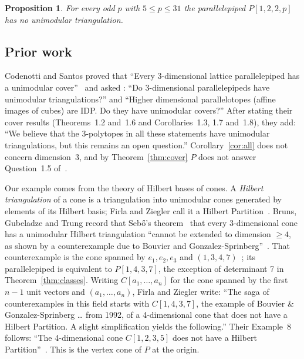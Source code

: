 \documentclass[11pt]{article}
\newtheorem{proposition}[theorem]{Proposition}
\theoremstyle{definition}
\begin{document}
\begin{proposition}\label{prop:family}
For every odd $p$ with $5\le p\le 31$ the parallelepiped $P[1,2,2,p]$ has no
unimodular triangulation.
\end{proposition}

\subsection{Prior work}\label{sec:prior}

Codenotti and Santos proved that ``Every 3-dimensional lattice
parallelepiped has a unimodular cover''~\cite[Theorem~1.2]{CS} and asked
\cite[Questions~1.4 and~1.5]{CS}: ``Do 3-dimensional parallelepipeds have
unimodular triangulations?'' and ``Higher dimensional parallelotopes
(affine images of cubes) are IDP. Do they have unimodular covers?'' After
stating their cover results (Theorems~1.2 and~1.6 and Corollaries~1.3, 1.7
and~1.8), they add: ``We believe that the 3-polytopes in all these
statements have unimodular triangulations, but this remains an open
question.'' Corollary~\ref{cor:all} does not concern dimension~3, and by
Theorem~\ref{thm:cover} $P$ does not answer Question~1.5 of~\cite{CS}.

Our example comes from the theory of Hilbert bases of cones. A
\emph{Hilbert triangulation} of a cone is a triangulation into unimodular
cones generated by elements of its Hilbert basis; Firla and Ziegler call it
a Hilbert Partition~\cite[Proposition~3]{FZ}. Bruns, Gubeladze and Trung
record that Sebő's theorem~\cite{Se} that every 3-dimensional cone has a
unimodular Hilbert triangulation ``cannot be extended to dimension $\ge 4$,
as shown by a counterexample due to Bouvier and
Gonzalez-Sprinberg''~\cite[Section~3.1 and Theorem~3.1.3]{BGT}. That
counterexample is the cone spanned by $e_1,e_2,e_3$ and
$(1,3,4,7)$~\cite[Exemple~3.1]{BGS}; its parallelepiped is equivalent to
$P[1,4,3,7]$, the exception of determinant 7 in Theorem~\ref{thm:classes}.
Writing $C[a_1,\dots,a_n]$ for the cone spanned by the first $n-1$ unit
vectors and $(a_1,\dots,a_n)$, Firla and Ziegler write: ``The saga of
counterexamples in this field starts with $C[1,4,3,7]$, the example of
Bouvier \& Gonzalez-Sprinberg \dots{} from 1992, of a 4-dimensional cone
that does not have a Hilbert Partition. A slight simplification yields the
following.'' Their Example~8 follows: ``The 4-dimensional cone
$C[1,2,3,5]$ does not have a Hilbert Partition''~\cite{FZ}. This is the
vertex cone of $P$ at the origin.
\end{document}
